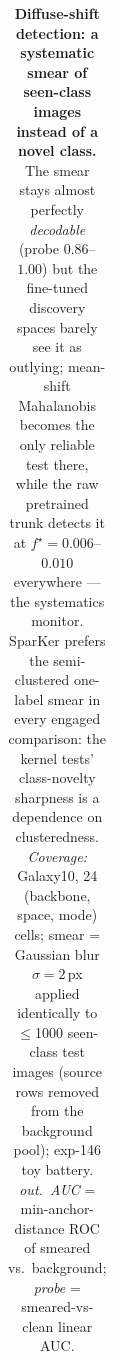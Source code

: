 \begin{table}[t]
\begin{tabular}{lcccccccccc}
\bottomrule
\end{tabular}
\caption{\textbf{Diffuse-shift detection: a systematic smear of seen-class images instead of a novel class.}  The smear stays almost perfectly \emph{decodable} (probe $0.86$--$1.00$) but the fine-tuned discovery spaces barely see it as outlying; mean-shift Mahalanobis becomes the only reliable test there, while the raw pretrained trunk detects it at $f^\star{=}0.006$--$0.010$ everywhere --- the systematics monitor.  SparKer prefers the semi-clustered one-label smear in every engaged comparison: the kernel tests' class-novelty sharpness is a dependence on clusteredness. \emph{Coverage:} Galaxy10, 24 (backbone, space, mode) cells; smear = Gaussian blur $\sigma{=}2$\,px applied identically to $\le$1000 seen-class test images (source rows removed from the background pool); exp-146 toy battery.  \emph{out.\ AUC} = min-anchor-distance ROC of smeared vs.\ background; \emph{probe} = smeared-vs-clean linear AUC.}
\label{tab:sigma_diffuse}
\end{table}
